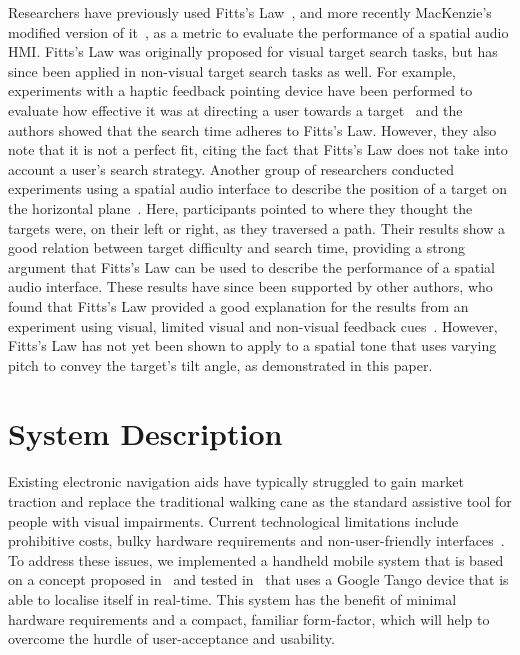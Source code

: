 \documentclass{article}
\begin{document}
Researchers have previously used Fitts's Law~\cite{fitts1954information}, and more recently MacKenzie's modified version of it~\cite{mackenzie1992fitts}, as a metric to evaluate the performance of a spatial audio HMI\@.
Fitts's Law was originally proposed for visual target search tasks, but has since been applied in non-visual target search tasks as well.
For example, experiments with a haptic feedback pointing device have been performed to evaluate how effective it was at directing a user towards a target~\cite{ahmaniemi2009augmented} and the authors showed that the search time adheres to Fitts's Law.
However, they also note that it is not a perfect fit, citing the fact that Fitts's Law does not take into account a user's search strategy.
Another group of researchers conducted experiments using a spatial audio interface to describe the position of a target on the horizontal plane~\cite{marentakis2006effects}.
Here, participants pointed to where they thought the targets were, on their left or right, as they traversed a path.
Their results show a good relation between target difficulty and search time, providing a strong argument that Fitts's Law can be used to describe the performance of a spatial audio interface.
These results have since been supported by other authors, who found that Fitts's Law provided a good explanation for the results from an experiment using visual, limited visual and non-visual feedback cues~\cite{wu2010fitts}.
However, Fitts's Law has not yet been shown to apply to a spatial tone that uses varying pitch to convey the target's tilt angle, as demonstrated in this paper.

\section{System Description}\label{sec:system-description}

Existing electronic navigation aids have typically struggled to gain market traction and replace the traditional walking cane as the standard assistive tool for people with visual impairments.
Current technological limitations include prohibitive costs, bulky hardware requirements and non-user-friendly interfaces~\cite{golledge2004stated,yusif2016older,arditi2013user}.
To address these issues, we implemented a handheld mobile system that is based on a concept proposed in~\cite{lock2017portable,lock2019active} and tested in~\cite{lock2019bone} that uses a Google Tango device that is able to localise itself in real-time.
This system has the benefit of minimal hardware requirements and a compact, familiar form-factor, which will help to overcome the hurdle of user-acceptance and usability.
\end{document}
